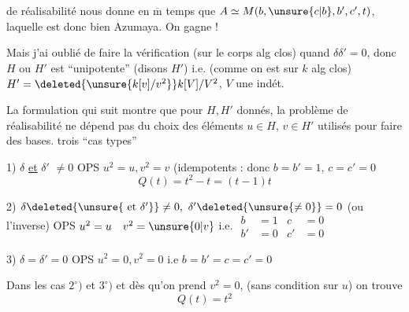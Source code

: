 de réalisabilité nous donne en $\overline{\mathrm m}$ temps que $A\simeq M(b,\unsure{c|b},b',c',t)$, laquelle est donc bien Azumaya. On gagne !

Mais j'ai oublié de faire la vérification (sur le  corps alg clos) quand $\delta\delta'=0$, donc $H$ ou $H'$ est ``unipotente''  (disons $H'$) i.e.   (comme on est sur $k$ alg clos)  $H'=\deleted{\unsure{k[v]/v^2}}k[V]/V^2$, $V$ une indét. 

La formulation qui suit montre que pour $H,H'$ donnés, la  problème de réalisabilité ne dépend pas du choix des  éléments $u\in H$, $v\in H'$ utilisés pour faire des bases.   trois ``cas types''

1) $\delta$ \uline{et} $\delta'$ $\ne0$ \quad OPS $u^2=u,v^2=v$ (idempotents : donc $b=b'=1$, $c=c'=0$
\[
Q(t)=t^2-t=(t-1)t
\]

2) $\delta\deleted{\unsure{\text{ et }\delta'}}\ne0,\ \delta'\deleted{\unsure{\ne0}}=0$ (ou l'inverse) OPS \quad $u^2=u\quad v^2=\unsure{0|v}$ i.e. $\begin{aligned}b&=1&c&=0\\b'&=0&c'&=0\end{aligned}$

3) $\delta=\delta'=0$ \quad OPS \quad $u^2=0,v^2=0$ i.e $b=b'=c=c'=0$

Dans les cas $2^\circ)$ et $3^\circ)$ et dès qu'on prend $v^2=0$, (sans condition sur $u$) on trouve
\[
Q(t)=t^2
\]
